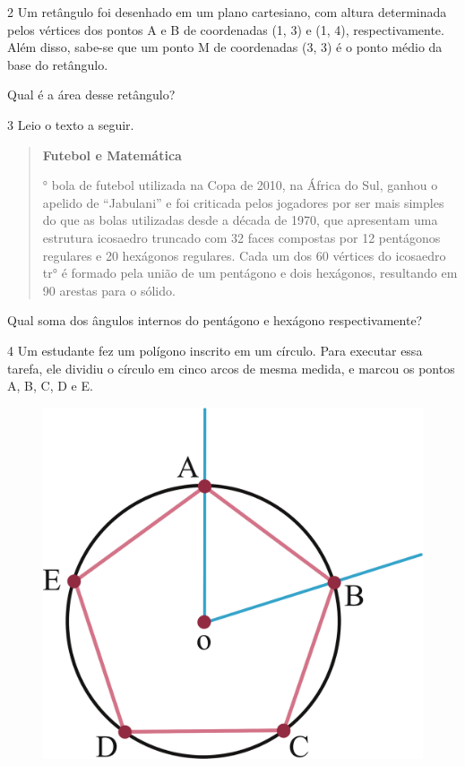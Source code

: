 \num{2} Um retângulo foi desenhado em um plano cartesiano, com altura
determinada pelos vértices dos pontos A e B de coordenadas (1, 3) e (1,
4), respectivamente. Além disso, sabe-se que um ponto M de
coordenadas (3, 3) é o ponto médio da base do retângulo.

Qual é a área desse retângulo?

\begin{emptybox}
\end{emptybox}

\num{3} Leio o texto a seguir.

\begin{quote}
\textbf{Futebol e Matemática}

° bola de futebol utilizada na Copa de 2010, na África do Sul, ganhou o
apelido de ``Jabulani'' e foi criticada pelos jogadores por ser mais
simples do que as bolas utilizadas desde a década de 1970, que
apresentam uma estrutura icosaedro truncado com 32 faces compostas por
12 pentágonos regulares e 20 hexágonos regulares. Cada um dos 60
vértices do icosaedro tr° é formado pela união de um pentágono e
dois hexágonos, resultando em 90 arestas para o sólido.
\end{quote}

\pagebreak
Qual soma dos ângulos internos do pentágono e hexágono respectivamente?

\begin{emptybox}
\end{emptybox}

\num{4} Um estudante fez um polígono inscrito em um círculo. Para executar
essa tarefa, ele dividiu o círculo em cinco arcos de mesma medida, e
marcou os pontos A, B, C, D e E.

\begin{figure}[htpb!]
\centering
\includegraphics[width=.5\textwidth]{./ilustras-mat/modulo_11-atividade_4.png}
\end{figure}

